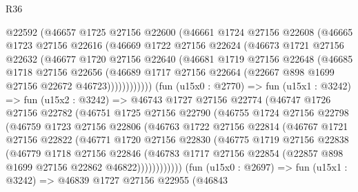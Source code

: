 \begin{lexlean}{R36}
\begin{coremodule}
            @22592
            (@46657
              @1725
              @27156
              @22600
              (@46661
                @1724
                @27156
                @22608
                (@46665
                  @1723
                  @27156
                  @22616
                  (@46669
                    @1722
                    @27156
                    @22624
                    (@46673
                      @1721
                      @27156
                      @22632
                      (@46677
                        @1720
                        @27156
                        @22640
                        (@46681
                          @1719
                          @27156
                          @22648
                          (@46685
                            @1718
                            @27156
                            @22656
                            (@46689
                              @1717
                              @27156
                              @22664
                              (@22667 @898 @1699 @27156 @22672 @46723))))))))))))
        (fun (u15x0 : @2770) =>
        fun (u15x1 : @3242) =>
        fun (u15x2 : @3242) =>
        @46743
          @1727
          @27156
          @22774
          (@46747
            @1726
            @27156
            @22782
            (@46751
              @1725
              @27156
              @22790
              (@46755
                @1724
                @27156
                @22798
                (@46759
                  @1723
                  @27156
                  @22806
                  (@46763
                    @1722
                    @27156
                    @22814
                    (@46767
                      @1721
                      @27156
                      @22822
                      (@46771
                        @1720
                        @27156
                        @22830
                        (@46775
                          @1719
                          @27156
                          @22838
                          (@46779
                            @1718
                            @27156
                            @22846
                            (@46783
                              @1717
                              @27156
                              @22854
                              (@22857 @898 @1699 @27156 @22862 @46822))))))))))))
        (fun (u15x0 : @2697) =>
        fun (u15x1 : @3242) =>
        @46839
          @1727
          @27156
          @22955
          (@46843

\end{coremodule}
\end{lexlean}
